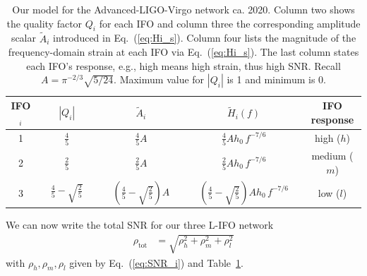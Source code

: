 \documentclass[prd,amsmath,amssymb,aps,floats,amsfonts,notitlepage,superscriptaddress,eqsecnum,nofootinbib,10pt]{revtex4-1}
\newcommand{\nn}{\nonumber}
\newcommand{\f}{\frac}
\newcommand\T{\rule{0pt}{2.6ex}}       %
\newcommand\B{\rule[-1.2ex]{0pt}{0pt}} %
\begin{document}
\begin{table}[h]
\centering
\begin{tabular}{ccccc}
\hline\hline
 IFO$_i$  %
 & $|Q_i|$ & $\tilde{A}_i$ & $\tilde{H}_i(f)$ & IFO response\T\B \\
 \hline
 1 &  $\tfrac{4}{5} $&  $\tfrac{4}{5}A$ & $\tfrac{4}{5}A h_0\, f^{-7/6}$ & high ($h$) \T\\
 2 &  $\tfrac{2}{5} $ & $\tfrac{2}{5}A$ & $ \tfrac{2}{5}A h_0 \, f^{-7/6}$ & medium ($m$)\B\T \\
 3 &  $\quad \tfrac{4}{5}-\sqrt{\tfrac{2}{5}} \quad $
 & $\quad\left(\tfrac{4}{5}-\sqrt{\tfrac{2}{5}}\right)A \quad$ & $\quad \left(\tfrac{4}{5}-\sqrt{\tfrac{2}{5}}\right)A h_0 \, f^{-7/6}\quad$& low ($l$) \B \\
 \hline\hline
\end{tabular}
\caption{%
Our model for the Advanced-LIGO-Virgo network ca. 2020. %
Column two shows the quality factor $Q_i$ for each IFO and column three the corresponding amplitude scalar $\tilde{A}_i$ introduced
in Eq.~(\ref{eq:Hi_s}).
Column four lists the magnitude of the frequency-domain strain at each IFO via Eq.~(\ref{eq:Hi_s}).
The last column states each IFO's response, e.g., high means high strain, thus high SNR.
Recall $A= \pi^{-2/3} \sqrt{5/24}$. Maximum value for $|Q_i|$ is 1 and minimum is 0.
}\label{table:network_params}
\end{table}
%
%
We can now write the total SNR for our three L-IFO network
%
\begin{align}
\rho_\text{tot} &= \sqrt{\rho^2_h+\rho^2_m+\rho^2_l} \label{eq:SNR_total_3IFOs} 
\end{align}
%
with $\rho_h, \rho_m,\rho_l$ given by Eq.~(\ref{eq:SNR_i}) and Table~\ref{table:network_params}.
\end{document}
